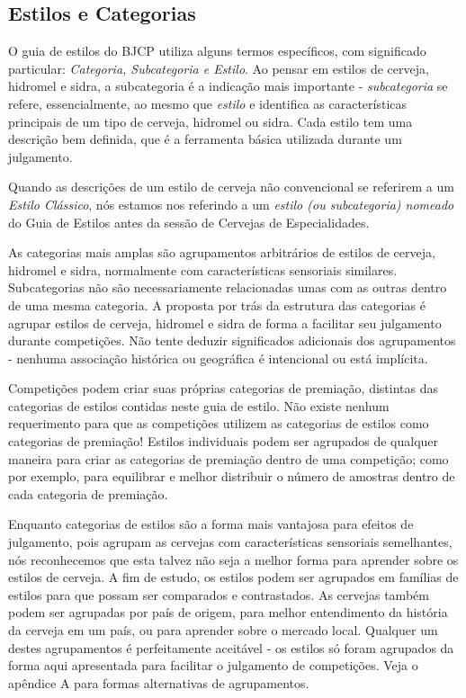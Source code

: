 \subsection*{Estilos e Categorias}
O guia de estilos do BJCP utiliza alguns termos específicos, com significado particular: \textit{Categoria, Subcategoria e Estilo}. Ao pensar em estilos de cerveja, hidromel e sidra, a subcategoria é a indicação mais importante - \textit{subcategoria} se refere, essencialmente, ao mesmo que \textit{estilo} e identifica as características principais de um tipo de cerveja, hidromel ou sidra. Cada estilo tem uma descrição bem definida, que é a ferramenta básica utilizada durante um julgamento.

Quando as descrições de um estilo de cerveja não convencional se referirem a um \textit{Estilo Clássico}, nós estamos nos referindo a um \textit{estilo (ou subcategoria) nomeado} do Guia de Estilos antes da sessão de Cervejas de Especialidades.

As categorias mais amplas são agrupamentos arbitrários de estilos de cerveja, hidromel e sidra, normalmente com características sensoriais similares. Subcategorias não são necessariamente relacionadas umas com as outras dentro de uma mesma categoria. A proposta por trás da estrutura das categorias é agrupar estilos de cerveja, hidromel e sidra de forma a facilitar seu julgamento durante competições. Não tente deduzir significados adicionais dos agrupamentos - nenhuma associação histórica ou geográfica é intencional ou está implícita.

Competições podem criar suas próprias categorias de premiação, distintas das categorias de estilos contidas neste guia de estilo. Não existe nenhum requerimento para que as competições utilizem as categorias de estilos como categorias de premiação! Estilos individuais podem ser agrupados de qualquer maneira para criar as categorias de premiação dentro de uma competição; como por exemplo, para equilibrar e melhor distribuir o número de amostras dentro de cada categoria de premiação.

Enquanto categorias de estilos são a forma mais vantajosa para efeitos de julgamento, pois agrupam as cervejas com características sensoriais semelhantes, nós reconhecemos que esta talvez não seja a melhor forma para aprender sobre os estilos de cerveja. A fim de estudo, os estilos podem ser agrupados em famílias de estilos para que possam ser comparados e contrastados. As cervejas também podem ser agrupadas por país de origem, para melhor entendimento da história da cerveja em um país, ou para aprender sobre o mercado local. Qualquer um destes agrupamentos é perfeitamente aceitável - os estilos só foram agrupados da forma aqui apresentada para facilitar o julgamento de competições. Veja o apêndice A para formas alternativas de agrupamentos.
